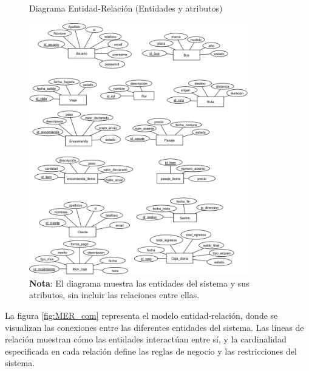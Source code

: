 	\begin{figure}[!h] %
		\caption[Diagrama Entidad-Relación ]
		{\newline Diagrama Entidad-Relación (Entidades y atributos)} %
		\vspace{0.3cm}
		\centering
		\includegraphics[width=0.85\textwidth]{imagenes/cap_3/MER_ent_atri.png} %
		\vspace{0.6cm}
			\caption*{\textup{\textbf{Nota}: El diagrama muestra las entidades del sistema y sus atributos, sin incluir las relaciones entre ellas.}}
		\vspace{-0.6cm}
		\label{fig:ent_atri} %
	\end{figure}
	
	La figura \ref{fig:MER_com} representa el modelo entidad-relación, donde se visualizan las conexiones entre las diferentes entidades del sistema. Las líneas de relación muestran cómo las entidades interactúan entre sí, y la cardinalidad especificada en cada relación define las reglas de negocio y las restricciones del sistema.
	
